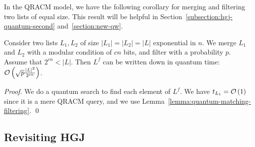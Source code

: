 
In the QRACM model, we have the following corollary for merging and filtering two lists of equal size. This result will be helpful in Section~\ref{subsection:hgj-quantum-second} and~\ref{section:new-qw}.

\begin{corollary}\label{lemma:symmetric-merging}
Consider two lists $L_1, L_2$ of size $|L_1| = |L_2| = |L|$ exponential in $n$. We merge $L_1$ and $L_2$ with a modular condition of $cn$ bits, and filter with a probability $p$. Assume that $2^{cn} < |L|$. Then $L^f$ can be written down in quantum time: $\mathcal{O} \left( \sqrt{p} \frac{|L|^2}{2^{cn}}  \right) $.
\end{corollary}

\begin{proof}
We do a quantum search to find each element of $L^f$. We have $t_{L_1} = \mathcal{O} \left(1 \right)$ since it is a mere QRACM query, and we use Lemma~\ref{lemma:quantum-matching-filtering}. \qed
\end{proof}



\subsection{Revisiting HGJ}
\label{subsection:hgj-quantum-first}

